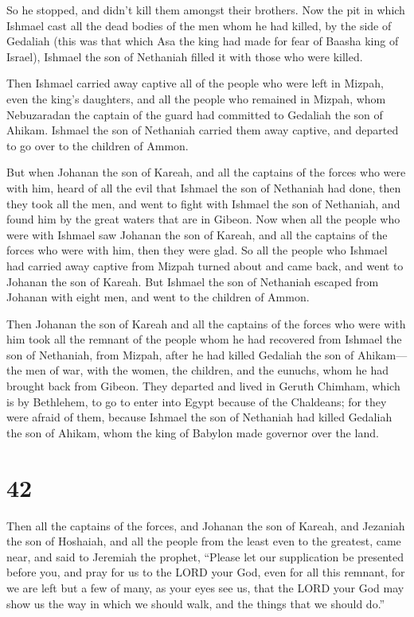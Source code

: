 So he stopped, and didn't kill them amongst their brothers.
 Now the pit in which Ishmael cast all the dead bodies of
the men whom he had killed, by the side of Gedaliah (this was that which
Asa the king had made for fear of Baasha king of Israel), Ishmael the
son of Nethaniah filled it with those who were killed.

 Then Ishmael carried away captive all of the people who
were left in Mizpah, even the king's daughters, and all the people who
remained in Mizpah, whom Nebuzaradan the captain of the guard had
committed to Gedaliah the son of Ahikam. Ishmael the son of Nethaniah
carried them away captive, and departed to go over to the children of
Ammon.

 But when Johanan the son of Kareah, and all the captains
of the forces who were with him, heard of all the evil that Ishmael the
son of Nethaniah had done,  then they took all the men,
and went to fight with Ishmael the son of Nethaniah, and found him by
the great waters that are in Gibeon.  Now when all the
people who were with Ishmael saw Johanan the son of Kareah, and all the
captains of the forces who were with him, then they were glad.
 So all the people who Ishmael had carried away captive
from Mizpah turned about and came back, and went to Johanan the son of
Kareah.  But Ishmael the son of Nethaniah escaped from
Johanan with eight men, and went to the children of Ammon.

 Then Johanan the son of Kareah and all the captains of
the forces who were with him took all the remnant of the people whom he
had recovered from Ishmael the son of Nethaniah, from Mizpah, after he
had killed Gedaliah the son of Ahikam---the men of war, with the women,
the children, and the eunuchs, whom he had brought back from Gibeon.
 They departed and lived in Geruth Chimham, which is by
Bethlehem, to go to enter into Egypt  because of the
Chaldeans; for they were afraid of them, because Ishmael the son of
Nethaniah had killed Gedaliah the son of Ahikam, whom the king of
Babylon made governor over the land.

\hypertarget{section-41}{%
\section{42}\label{section-41}}

 Then all the captains of the forces, and Johanan the son
of Kareah, and Jezaniah the son of Hoshaiah, and all the people from the
least even to the greatest, came near,  and said to
Jeremiah the prophet, ``Please let our supplication be presented before
you, and pray for us to the LORD your God, even for all this remnant,
for we are left but a few of many, as your eyes see us, 
that the LORD your God may show us the way in which we should walk, and
the things that we should do.''

